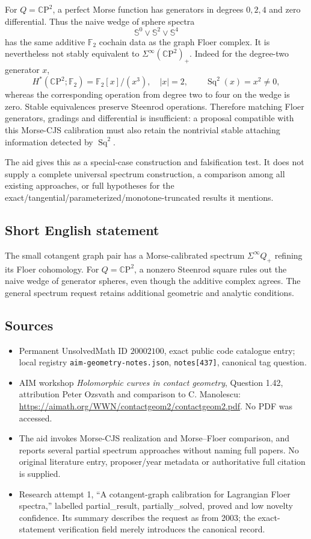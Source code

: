 \documentclass[11pt]{article}
\newcommand{\C}{\mathbb{C}}
\newcommand{\F}{\mathbb{F}}
\begin{document}
For \(Q=\C\mathrm P^2\), a perfect Morse function has generators in degrees \(0,2,4\) and zero differential. Thus the naive wedge of sphere spectra
\[
 \mathbb S^0\vee\mathbb S^2\vee\mathbb S^4
\]
has the same additive \(\F_2\) cochain data as the graph Floer complex. It is nevertheless not stably equivalent to \(\Sigma^\infty(\C\mathrm P^2)_+\). Indeed for the degree-two generator \(x\),
\[
 H^*(\C\mathrm P^2;\F_2)=\F_2[x]/(x^3),\quad|x|=2,
 \qquad\operatorname{Sq}^2(x)=x^2\ne0,
\]
whereas the corresponding operation from degree two to four on the wedge is zero. Stable equivalences preserve Steenrod operations. Therefore matching Floer generators, gradings and differential is insufficient: a proposal compatible with this Morse-CJS calibration must also retain the nontrivial stable attaching information detected by \(\operatorname{Sq}^2\).

The aid gives this as a special-case construction and falsification test. It does not supply a complete universal spectrum construction, a comparison among all existing approaches, or full hypotheses for the exact/tangential/parameterized/monotone-truncated results it mentions.
\subsection{Short English statement}
The small cotangent graph pair has a Morse-calibrated spectrum \(\Sigma^\infty Q_+\) refining its Floer cohomology. For \(Q=\C\mathrm P^2\), a nonzero Steenrod square rules out the naive wedge of generator spheres, even though the additive complex agrees. The general spectrum request retains additional geometric and analytic conditions.
\subsection{Sources}
\begin{itemize}
\item Permanent UnsolvedMath ID \(20002100\), exact public code catalogue entry; local registry \texttt{aim-geometry-notes.json}, \texttt{notes[437]}, canonical tag question.
\item AIM workshop \emph{Holomorphic curves in contact geometry}, Question 1.42, attribution Peter Ozsvath and comparison to C. Manolescu: \url{https://aimath.org/WWN/contactgeom2/contactgeom2.pdf}. No PDF was accessed.
\item The aid invokes Morse-CJS realization and Morse--Floer comparison, and reports several partial spectrum approaches without naming full papers. No original literature entry, proposer/year metadata or authoritative full citation is supplied.
\item Research attempt 1, ``A cotangent-graph calibration for Lagrangian Floer spectra,'' labelled partial\_result, partially\_solved, proved and low novelty confidence. Its summary describes the request as from 2003; the exact-statement verification field merely introduces the canonical record.
\end{itemize}
\end{document}
